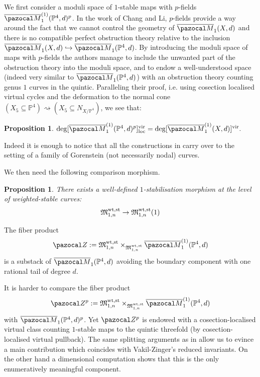 \documentclass[11pt]{amsart}
\newcommand{\Mone}[3]{\overline{\pazocal M}^{(1)}_{#1}(#2,#3)}
\newcommand{\PP}{\mathbb P}
\renewcommand{\to}{\rightarrow}
\newcommand{\Z}{\pazocal Z}
\newcommand{\Zp}{\pazocal Z^p}
\newcommand{\MM}{\mathfrak M}
\newcommand{\oM}{\overline{\pazocal M}}
\newcommand{\tM}{\widetilde{\pazocal M}}
\newcommand{\vir}[1]{[#1]^{\rm{vir}}}
\newcommand{\virloc}[1]{[#1]^{\rm{vir}}_{\rm{loc}}}
\theoremstyle{plain}
\newtheorem{prop}[thm]{Proposition}
\theoremstyle{definition}
\begin{document}

We first consider a moduli space of $1$-stable maps with $p$-fields $\Mone{1}{\PP^4}{d}^p$. In the work of Chang and Li, $p$-fields provide a way around the fact that we cannot control the geometry of $\oM_1(X,d)$ and there is no compatible perfect obstruction theory relative to the inclusion $\oM_1(X,d)\hookrightarrow \oM_1(\PP^4,d)$. By introducing the moduli space of maps with $p$-fields the authors manage to include the unwanted part of the obstruction theory into the moduli space, and to endow a well-understood space (indeed very similar to $\oM_1(\PP^4,d)$) with an obstruction theory counting genus $1$ curves in the quintic. Paralleling their proof, i.e. using cosection localised virtual cycles \cite{KLcosection} and the deformation to the normal cone $(X_5\subseteq \PP^4)\rightsquigarrow(X_5\subseteq N_{X/\PP^4})$, we see that:
\begin{prop}
$\deg\virloc{\Mone{1}{\PP^4}{d}^p}=\deg\vir{\Mone{1}{X}{d}}.$
\end{prop}
Indeed it is enough to notice that all the constructions in \cite{CLpfields} carry over to the setting of a family of Gorenstein (not necessarily nodal) curves.

We then need the following comparison morphism.
\begin{prop}
There exists a well-defined $1$-stabilisation morphism at the level of weighted-stable curves:
\[
\MM_{1,n}^{\rm{wt,st}}\to \MM_{1,n}^{\rm{wt,st}}(1)
\]
\end{prop}
The fiber product
\[
\Z:=\MM_{1,n}^{\rm{wt,st}}\times_{\MM_{1,n}^{\rm{wt,st}}}\Mone{1}{\PP^4}{d}
\]
is a substack of $\oM_1(\PP^4,d)$ avoiding the boundary component with one rational tail of degree $d$.

It is harder to compare the fiber product
\[
\Zp:=\MM_{1,n}^{\rm{wt,st}}\times_{\MM_{1,n}^{\rm{wt,st}}}\Mone{1}{\PP^4}{d}
\]
with $\oM_1(\PP^4,d)^p$. Yet $\Zp$ is endowed with a cosection-localised virtual class counting $1$-stable maps to the quintic threefold (by cosection-localised virtual pullback). The same splitting arguments as in \cite{CLpfields} allow us to evince a main contribution which coincides with Vakil-Zinger's reduced invariants. On the other hand a dimensional computation shows that this is the only enumeratively meaningful component.
\end{document}
